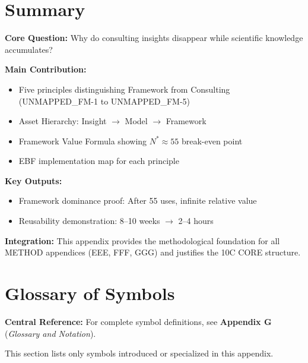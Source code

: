 \section{Summary}
\label{sec:fm-summary}

\begin{tcolorbox}[colback=green!10!white, colframe=green!75!black,
    title=\textbf{Appendix UNMAPPED_FM: Summary}]

\textbf{Core Question:} Why do consulting insights disappear while scientific knowledge accumulates?

\textbf{Main Contribution:}
\begin{itemize}[nosep]
    \item Five principles distinguishing Framework from Consulting (UNMAPPED_FM-1 to UNMAPPED_FM-5)
    \item Asset Hierarchy: Insight $\to$ Model $\to$ Framework
    \item Framework Value Formula showing $N^* \approx 55$ break-even point
    \item EBF implementation map for each principle
\end{itemize}

\textbf{Key Outputs:}
\begin{itemize}[nosep]
    \item Framework dominance proof: After 55 uses, infinite relative value
    \item Reusability demonstration: 8--10 weeks $\to$ 2--4 hours
\end{itemize}

\textbf{Integration:} This appendix provides the methodological foundation for all METHOD appendices (EEE, FFF, GGG) and justifies the 10C CORE structure.

\end{tcolorbox}


\section{Glossary of Symbols}
\label{sec:fm-glossary}

\begin{tcolorbox}[colback=blue!5!white, colframe=blue!75!black]
\textbf{Central Reference:} For complete symbol definitions, see
\textbf{Appendix G} (\textit{Glossary and Notation}).

This section lists only symbols introduced or specialized in this appendix.
\end{tcolorbox}

